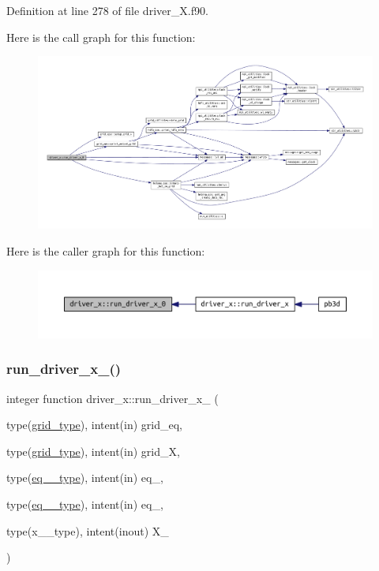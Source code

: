 Definition at line 278 of file driver\+\_\+\+X.\+f90.

Here is the call graph for this function\+:\nopagebreak
\begin{figure}[H]
\begin{center}
\leavevmode
\includegraphics[width=350pt]{namespacedriver__x_a2b82a9bc6c0f4af9f3468d03fedc008e_cgraph}
\end{center}
\end{figure}
Here is the caller graph for this function\+:\nopagebreak
\begin{figure}[H]
\begin{center}
\leavevmode
\includegraphics[width=350pt]{namespacedriver__x_a2b82a9bc6c0f4af9f3468d03fedc008e_icgraph}
\end{center}
\end{figure}
\mbox{\label{namespacedriver__x_a454779cefa6da3714d32eedcec0ef7de}} 
\subsubsection{\texorpdfstring{run\+\_\+driver\+\_\+x\+\_()}{run\_driver\_x\_1()}}
{\footnotesize\ttfamily integer function driver\+\_\+x\+::run\+\_\+driver\+\_\+x\+\_ (\begin{DoxyParamCaption}\item[{type(\hyperlink{structgrid__vars_1_1grid__type}{grid\+\_\+type}), intent(in)}]{grid\+\_\+eq,  }\item[{type(\hyperlink{structgrid__vars_1_1grid__type}{grid\+\_\+type}), intent(in)}]{grid\+\_\+X,  }\item[{type(\hyperlink{structeq__vars_1_1eq__1__type}{eq\+\_\+1\+\_\+type}), intent(in)}]{eq\+\_,  }\item[{type(\hyperlink{structeq__vars_1_1eq__2__type}{eq\+\_\+2\+\_\+type}), intent(in)}]{eq\+\_,  }\item[{type(x\+\_\+1\+\_\+type), intent(inout)}]{X\+\_ }\end{DoxyParamCaption})}



